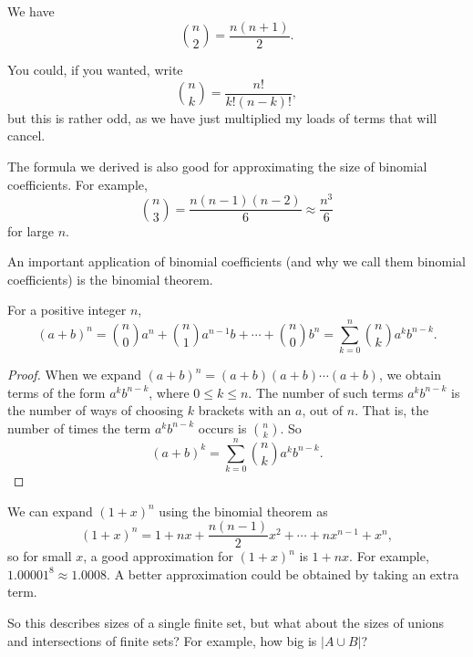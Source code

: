 \begin{example}
	We have
	$$
	\binom{n}{2} = \frac{n(n + 1)}{2}.
	$$
\end{example}

\begin{remark}
	You could, if you wanted, write
$$
\binom{n}{k} = \frac{n!}{k!(n - k)!},
$$
but this is rather odd, as we have just multiplied my loads of terms that will cancel.
\end{remark}

The formula we derived is also good for approximating the size of binomial coefficients. For example,
$$
\binom{n}{3} = \frac{n(n - 1)(n - 2)}{6} \approx \frac{n^3}{6}
$$
for large $n$.


An important application of binomial coefficients (and why we call them binomial coefficients) is the binomial theorem.

\begin{theorem}
	For a positive integer $n$,
	$$
	(a + b)^n = \binom{n}{0}a^n + \binom{n}{1}a^{n - 1}b + \cdots + \binom{n}{0}b^n = \sum_{k = 0}^{n}\binom{n}{k}a^{k}b^{n - k}.
	$$
\end{theorem}
\begin{proof}
	When we expand $(a + b)^n = (a + b)(a + b)\cdots(a + b)$, we obtain terms of the form $a^k b^{n - k}$, where $0 \leq k \leq n$. The number of such terms $a^k b^{n - k}$ is the number of ways of choosing $k$ brackets with an $a$, out of $n$. That is, the number of times the term $a^k b^{n - k}$ occurs is $\binom{n}{k}$. So
	$$
	(a + b)^k = \sum_{k = 0}^{n}\binom{n}{k}a^{k}b^{n - k}.
	$$
\end{proof}

\begin{example}
	We can expand $(1 + x)^n$ using the binomial theorem as
	$$
	(1 + x)^n = 1 + nx + \frac{n(n - 1)}{2}x^2 + \cdots + n x^{n - 1} + x^n,
	$$
	so for small $x$, a good approximation for $(1 + x)^n$ is $1 + nx$. For example, $1.00001^8 \approx 1.0008$. A better approximation could be obtained by taking an extra term.
\end{example}

So this describes sizes of a single finite set, but what about the sizes of unions and intersections of finite sets? For example, how big is $|A \cup B|$?

